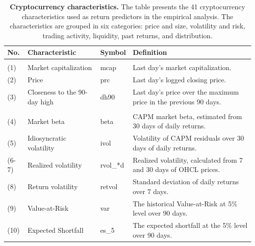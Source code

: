 \documentclass[
  12pt,
  a4paper,
  openany]{scrbook}
\begin{document}
\begin{table}
\centering
\caption[Cryptocurrency characteristics.]{\label{tab:unnamed-chunk-1}\textbf{Cryptocurrency characteristics.} The table presents the 41 cryptocurrency characteristics used as return predictors in the empirical analysis. The characteristics are grouped in six categories: price and size, volatility and risk, trading activity, liquidity, past returns, and distribution. \label{tbl-characteristics}}
\centering
\fontsize{8}{10}\selectfont
\begin{tabular}[t]{l>{\raggedright\arraybackslash}p{10em}l>{\raggedright\arraybackslash}p{27em}}
\toprule
No. & Characteristic & Symbol & Definition\\
\midrule
\addlinespace[0.3em]
\multicolumn{4}{l}{\textbf{Panel A: Price \& size}}\\
\hspace{1em}(1) & Market capitalization & mcap & Last day's market capitalization.\\
\hspace{1em}(2) & Price & prc & Last day's logged closing price.\\
\hspace{1em}(3) & Closeness to the 90-day high & dh90 & Last day's price over the maximum price in the previous 90 days.\\
\addlinespace[0.3em]
\multicolumn{4}{l}{\textbf{Panel B: Volatility \& risk}}\\
\hspace{1em}(4) & Market beta & beta & CAPM market beta, estimated from 30 days of daily returns.\\
\hspace{1em}(5) & Idiosyncratic volatility & ivol & Volatility of CAPM residuals over 30 days of daily returns.\\
\hspace{1em}(6-7) & Realized volatility & rvol\_*d & Realized volatility, calculated from 7 and 30 days of OHCL prices.\\
\hspace{1em}(8) & Return volatility & retvol & Standard deviation of daily returns over 7 days.\\
\hspace{1em}(9) & Value-at-Risk & var & The historical Value-at-Risk at 5\% level over 90 days.\\
\hspace{1em}(10) & Expected Shortfall & es\_5 & The expected shortfall at the 5\% level over 90 days.\\

\end{tabular}
\end{table}
\end{document}
